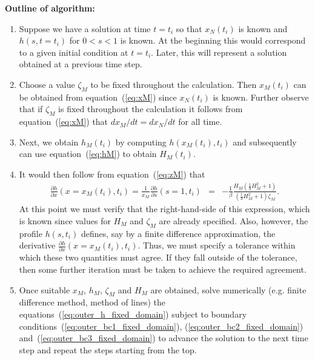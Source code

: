 \documentclass[11pt]{article}
\newcommand{\bea}{\begin{eqnarray}}
\newcommand{\eea}{\end{eqnarray}}
\begin{document}
{\bf Outline of algorithm: {\color{red}{DMA still thinking about some of these ideas ...}}}
\begin{enumerate}
\item Suppose we have a solution at time $t=t_i$ so that $x_N(t_i)$ is known and $h(s,t=t_i)$ for $0 < s < 1$ is known.  
At the beginning this would correspond to a given initial condition at $t=t_i$.  Later, this will represent a solution obtained at a previous time step.
%
\item Choose a value $\zeta_M$ to be fixed throughout the calculation.   Then $x_M(t_i)$ can be obtained from equation~(\ref{eq:xM}) since $x_N(t_i)$ is known.  Further
observe that if $\zeta_M$ is fixed throughout the calculation it follows from equation~(\ref{eq:xM}) that $d x_M/dt = d x_N/dt$ for all time.
%
\item Next, we obtain $h_M(t_i)$ by computing $h(x_M(t_i),t_i)$ and subsequently can use equation~(\ref{eq:hM}) to obtain $H_M(t_i)$.
%
\item It would then follow from equation~(\ref{eq:zM}) that
\bea
\frac{\partial h}{\partial x}(x=x_M(t_i),t_i)  = \frac{1}{x_M} \frac{\partial h}{\partial s}(s=1,t_i)& = & - \frac{1}{\beta} \frac{H_M \left( \frac{1}{9} H_M^2 + 1 \right) }{ \left( \frac{1}{3} H_M^2 + 1 \right) \zeta_M }.
\eea
At this point we must verify that the right-hand-side of this expression, which is known since values for $H_M$ and $\zeta_M$ are already specified.
Also, however, the profile $h(s,t_i)$ defines, say by a finite difference approximation, the derivative $\frac{\partial h}{\partial x}(x=x_M(t_i),t_i)$.  Thus, we
must specify a tolerance within which these two quantities must agree.  If they fall outside of the tolerance, then some further iteration must be taken to 
achieve the required agreement.
%
\item Once suitable $x_M$, $h_M$, $\zeta_M$ and $H_M$ are obtained, solve numerically (e.g. finite difference method, method of lines) the equations~(\ref{eq:outer_h_fixed_domain}) 
subject to boundary conditions~(\ref{eq:outer_bc1_fixed_domain}), (\ref{eq:outer_bc2_fixed_domain}) and~(\ref{eq:outer_bc3_fixed_domain}) to advance the solution to the next time step and repeat the steps starting from the top.
\end{enumerate}

\end{document}
